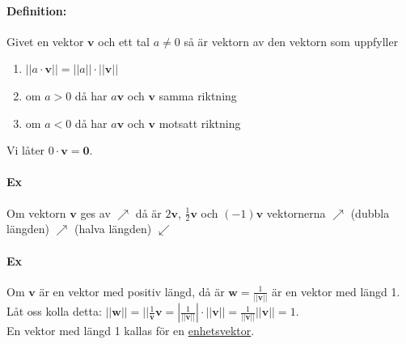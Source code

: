 \clearpage

\paragraph{Definition:} Givet en vektor $\bm{v}$ och ett tal $a\neq 0$ så är vektorn av den vektorn som uppfyller
\begin{enumerate}
    \item $||a\cdot \bm{v}||=||a||\cdot ||\bm{v}||$
    \item om $a>0$ då har $a\bm{v}$ och $\bm{v}$ samma riktning
    \item om $a<0$ då har $a\bm{v}$ och $\bm{v}$ motsatt riktning
\end{enumerate}
Vi låter $0\cdot \bm{v} = \bm{0} $.

\paragraph{Ex} Om vektorn $\bm{v}$ ges av $\nearrow $ då är $2\bm{v}$, $\frac{1}{2}\bm{v}$ och $(-1)\bm{v}$ vektornerna
$\nearrow$ (dubbla längden) $\nearrow$ (halva längden) $\swarrow $

\paragraph{Ex} Om $\bm{v}$ är en vektor med positiv längd, då är $\bm{w}=\frac{1}{||\bm{v}||}$ är en vektor med längd 1.
Låt oss kolla detta: $||\bm{w}|| = ||\frac{1}{\bm{v}}\bm{v}=|\frac{1}{||\bm{v}||}|\cdot ||\bm{v}||=\frac{1}{||\bm{v}||}||\bm{v}||=1$.\\
En vektor med längd 1 kallas för en \underline{enhetsvektor}.

